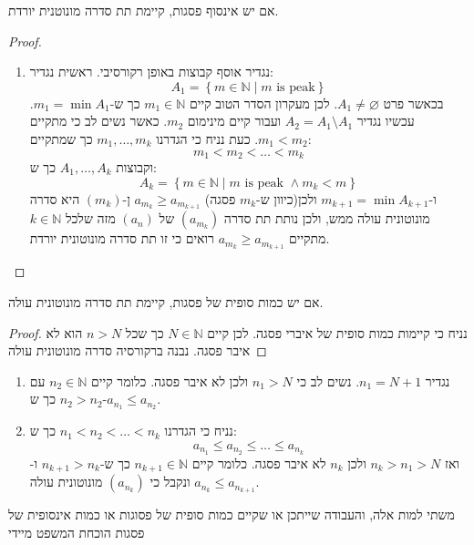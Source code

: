 \documentclass{tstextbook}
\begin{document}
\begin{lemma}
אם יש אינסוף פסגות, קיימת תת סדרה מונוטנית יורדת.

\end{lemma}
\begin{proof}
  \begin{enumerate}
    \item נגדיר אוסף קבוצות באופן רקורסיבי. ראשית נגדיר: 
$$A_{1}=\left\{  m \in \mathbb{N} \mid \text{\(m\) is peak}  \right\}$$
בכאשר פרט \(A_{1}\neq \varnothing\). לכן מעקרון הסדר הטוב קיים \(m_{1} \in \mathbb{N}\) כך ש-\(m_{1}=\min A_{1}\). עכשיו נגדיר \(A_{2}=A_{1}\setminus A_{1}\) ועבור קיים מינימום \(m_{2}\). כאשר נשים לב כי מתקיים \(m_{1}<m_{2}\). כעת נניח כי הגדרנו \(m_{1},\dots,m_{k}\) כך שמתקיים:
$$m_{1}<m_{2}<\dots<m_{k}$$
וקבוצות \(A_{1},\dots,A_{k}\) כך ש:
$$A_{k}=\left\{  m \in \mathbb{N} \mid \text{\(m\) is peak }\land m_{k}<m \right\}$$
ו-\(m_{k+1}=\min A_{k+1}\) ולכן(כיוון ש-\(m_{k}\) פסגה) \(a_{m_{k}}\geq a_{m_{k+1}}\) ן-\((m_{k})\) היא סדרה מונוטונית עולה ממש, ולכן נותת תת סדרה \((a_{m_{k}})\) של \((a_{n})\) מזה שלכל \(k \in \mathbb{N}\) מתקיים \(a_{m_{k}}\geq a_{m_{k+1}}\) רואים כי זו תת סדרה מונוטונית יורדת.
  \end{enumerate}
\end{proof}
\begin{lemma}
אם יש כמות סופית של פסגות, קיימת תת סדרה מונוטונית עולה.

\end{lemma}
\begin{proof}
נניח כי קיימות כמות סופית של איברי פסגה. לכן קיים \(N\in\mathbb{N}\) כך שכל \(n>N\) הוא לא איבר פסגה. נבנה ברקורסיה סדרה מונוטונית עולה

\end{proof}
\begin{enumerate}
  \item נגדיר \(n_{1}=N+1\). נשים לב כי \(n_{1}>N\) ולכן לא איבר פסגה. כלומר קיים \(n_{2} \in \mathbb{N}\) עם \(n_{2} > n_{2}\) כך ש-\(a_{n_{1}}\leq a_{n_{2}}\). 


  \item נניח כי הגדרנו \(n_{1}<n_{2}<\dots<n_{k}\) כך ש: 
$$a_{n_{1}}\leq a_{n_{2}}\leq \dots \leq a_{n_{k}}$$
ואז \(n_{k}>n_{1}>N\) ולכן \(n_{k}\) לא איבר פסגה. כלומר קיים \(n_{k+1}\in \mathbb{N}\) כך ש-\(n_{k+1}>n_{k}\) ו-\(a_{n_{k}}\leq a_{n_{k+1}}\) ונקבל כי \((a_{n_{k}})\) מונוטונית עולה.


\end{enumerate}
משתי למות אלה, והעבודה שייתכן או שקיים כמות סופית של פסוגות או כמות אינסופית של פסגות הוכחת המשפט מיידי
\end{document}
